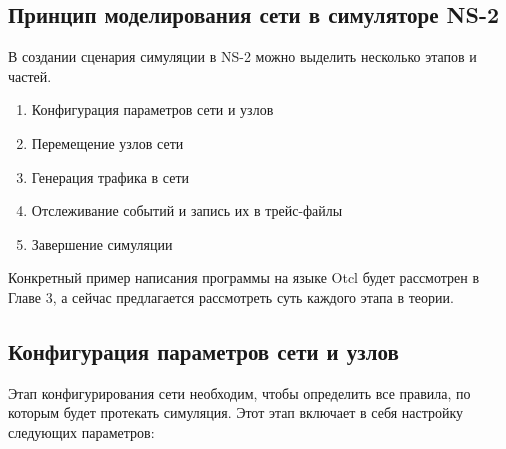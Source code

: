 \subsection*{Принцип моделирования сети в симуляторе NS-2}

В создании сценария симуляции в NS-2 можно выделить несколько этапов и частей.

\begin{enumerate}
  \item Конфигурация параметров сети и узлов
  \item Перемещение узлов сети
  \item Генерация трафика в сети
  \item Отслеживание событий и запись их в трейс-файлы
  \item Завершение симуляции
\end{enumerate}

Конкретный пример написания программы на языке Otcl будет рассмотрен в Главе 3, а сейчас предлагается рассмотреть суть каждого этапа в теории.

\subsection*{Конфигурация параметров сети и узлов}

Этап конфигурирования сети необходим, чтобы определить все правила, по которым будет протекать симуляция. Этот этап включает в себя настройку следующих параметров:

